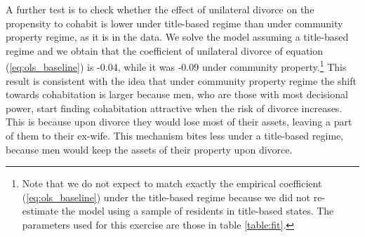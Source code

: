 \documentclass[12pt]{article}
\numberwithin{table}{section}
\begin{document}
A further test is to check whether the effect of unilateral divorce on the propensity to cohabit is lower under title-based regime than under community property regime, as it is in the data. We solve the model assuming a title-based regime and we obtain that the coefficient of unilateral divorce of equation (\ref{eq:ols_baseline}) is -0.04, while it was -0.09 under community property.\footnote{Note that we do not expect to match exactly the empirical coefficient (\ref{eq:ols_baseline}) under the title-based regime because we did not re-estimate the model using a sample of residents in title-based states. The parameters used for this exercise are those in table \ref{table:fit}.} This result is consistent with the idea that under community property regime the shift towards cohabitation is larger because men, who are those with most decisional power, start finding cohabitation attractive when the risk of divorce increases. This is because upon divorce they would lose most of their assets, leaving a part of them to their ex-wife. This mechanism bites less under a title-based regime, because men would keep the assets of their property upon divorce.
\end{document}

